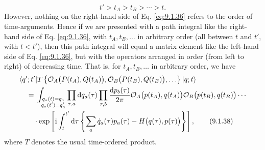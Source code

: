 \begin{equation}
  t'>t_A>t_B>\cdots>t.
  \tag{9.1.37}\label{eq:9.1.37}
\end{equation}
However, nothing on the right-hand side of Eq. \eqref{eq:9.1.36} refers to the order
of time-arguments. Hence if we are presented with a path integral like the
right-hand side of Eq. \eqref{eq:9.1.36}, with $t_A,t_B,\ldots$ in arbitrary order
(all between $t$ and $t'$, with $t<t'$), then this path integral will equal
a matrix element like the left-hand side of Eq. \eqref{eq:9.1.36}, but with the
operators arranged in order (from left to right) of decreasing time. That is,
for $t_A,t_B,\ldots$ in arbitrary order, we have
\begin{align}
  &\langle q';t'\rvert T\left\{\mathcal{O}_A\bigl(P(t_A),Q(t_A)\bigr),
  \mathcal{O}_B\bigl(P(t_B),Q(t_B)\bigr),\ldots\right\}\lvert q;t\rangle
  \notag\\
  &\quad={}
  \int_{\substack{q_a(t)=q_a\\q_a(t')=q'_a}}
  \prod_{\tau,a}\mathop{}\!\mathrm{d} q_a(\tau)\prod_{\tau,b}\frac{\mathop{}\!\mathrm{d} p_b(\tau)}{2\pi}
  \mathcal{O}_A\bigl(p(t_A),q(t_A)\bigr)
  \mathcal{O}_B\bigl(p(t_B),q(t_B)\bigr)\cdots
  \notag\\
  &\qquad\cdot\exp\left[\mathrm{i}\int_t^{t'}\mathop{}\!\mathrm{d}\tau
  \left\{\sum_a\dot q_a(\tau)p_a(\tau)
  -H\bigl(q(\tau),p(\tau)\bigr)\right\}\right],
  \tag{9.1.38}\label{eq:9.1.38}
\end{align}
where $T$ denotes the usual time-ordered product.

